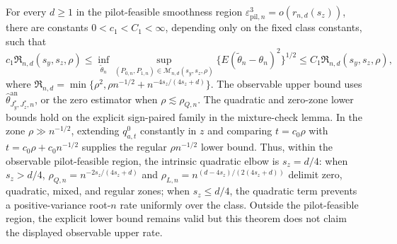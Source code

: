 For every \(d\ge1\) in the pilot-feasible smoothness region \(\varepsilon_{\mathrm{pil},n}^3=o(r_{n,d}(s_z))\), there are constants \(0<c_1<C_1<\infty\), depending only on the fixed class constants, such that
\[
c_1\mathfrak R_{n,d}(s_y,s_z,\rho)\le\inf_{\widetilde\theta_n}\sup_{(P_{0,n},P_{1,n})\in\mathcal M_{n,d}(s_y,s_z,\rho)}\{E(\widetilde\theta_n-\theta_n)^2\}^{1/2}\le C_1\mathfrak R_{n,d}(s_y,s_z,\rho),
\]
where \(\mathfrak R_{n,d}=\min\{\rho^2,\rho n^{-1/2}+n^{-4s_z/(4s_z+d)}\}\). The observable upper bound uses \(\widehat\theta^{\mathrm{an}}_{J_y^*,J_z^*,n}\), or the zero estimator when \(\rho\lesssim\rho_{Q,n}\). The quadratic and zero-zone lower bounds hold on the explicit sign-paired family in the mixture-check lemma. In the zone \(\rho\gg n^{-1/2}\), extending \(q_{a,t}^{0}\) constantly in \(z\) and comparing \(t=c_0\rho\) with \(t=c_0\rho+c_0n^{-1/2}\) supplies the regular \(\rho n^{-1/2}\) lower bound. Thus, within the observable pilot-feasible region, the intrinsic quadratic elbow is \(s_z=d/4\): when \(s_z>d/4\), \(\rho_{Q,n}=n^{-2s_z/(4s_z+d)}\) and \(\rho_{L,n}=n^{(d-4s_z)/(2(4s_z+d))}\) delimit zero, quadratic, mixed, and regular zones; when \(s_z\le d/4\), the quadratic term prevents a positive-variance root-\(n\) rate uniformly over the class. Outside the pilot-feasible region, the explicit lower bound remains valid but this theorem does not claim the displayed observable upper rate.